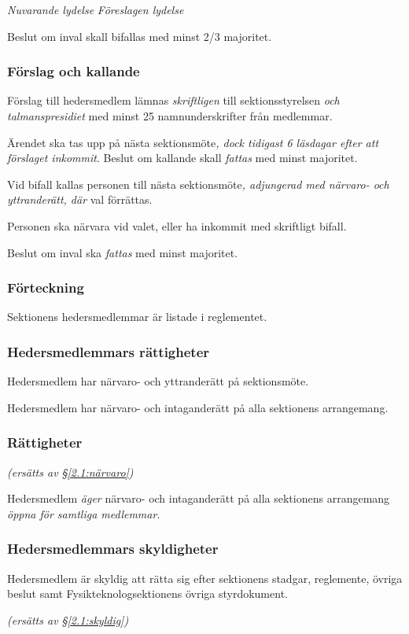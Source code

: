 \documentclass{article}
\newenvironment{lydelse}
    {\begin{paracol}{2}%
        \emph{Nuvarande lydelse}%
        \switchcolumn%
        \emph{Föreslagen lydelse}%
    \end{paracol}%
    \begin{enumerate}[label=\thesubsection.\arabic*]%
    \begin{paracol}{2}%
    }{\end{paracol}\end{enumerate}}
\newcommand{\itemb}{\item[\textbullet]}
\begin{document}
\begin{lydelse}
    \itemb Beslut om inval skall bifallas med minst 2/3 majoritet.
    
\switchcolumn
    \subsubsection*{Förslag och kallande}%
    
    \item Förslag till hedersmedlem lämnas \emph{skriftligen} till sektionsstyrelsen \emph{och talmanspresidiet} med minst 25 namnunderskrifter från medlemmar.

    \item Ärendet ska tas upp på nästa sektionsmöte\emph{, dock tidigast 6 läsdagar efter att förslaget inkommit}.
        Beslut om kallande skall \emph{fattas} med minst  majoritet.
    
    \item Vid bifall kallas personen till nästa sektionsmöte\emph{, adjungerad med närvaro- och yttranderätt, där} val förrättas.

    \item Personen ska närvara vid valet, eller ha inkommit med skriftligt bifall.

    \item Beslut om inval ska \emph{fattas} med minst  majoritet.
    
\switchcolumn*
    \subsubsection*{Förteckning}%
    \itemb Sektionens hedersmedlemmar är listade i reglementet.
    
\switchcolumn
\switchcolumn*
    \subsubsection*{Hedersmedlemmars rättigheter}%
    \itemb Hedersmedlem har närvaro- och yttranderätt på sektionsmöte.
    
    \itemb Hedersmedlem har närvaro- och intaganderätt på alla sektionens
arrangemang.
    
\switchcolumn
    \subsubsection*{Rättigheter}%
    \emph{(ersätts av \S \ref{2.1:närvaro})}
    
    \item Hedersmedlem \emph{äger} närvaro- och intaganderätt på alla sektionens
arrangemang \emph{öppna för samtliga medlemmar}.

\switchcolumn*
    \subsubsection*{Hedersmedlemmars skyldigheter}%
    \itemb Hedersmedlem är skyldig att rätta sig efter sektionens stadgar,
  regle\-mente, övriga beslut samt  Fysikteknologsektionens övriga styrdokument.
    
\switchcolumn
    \emph{(ersätts av \S \ref{2.1:skyldig})}
\end{lydelse}
\end{document}
